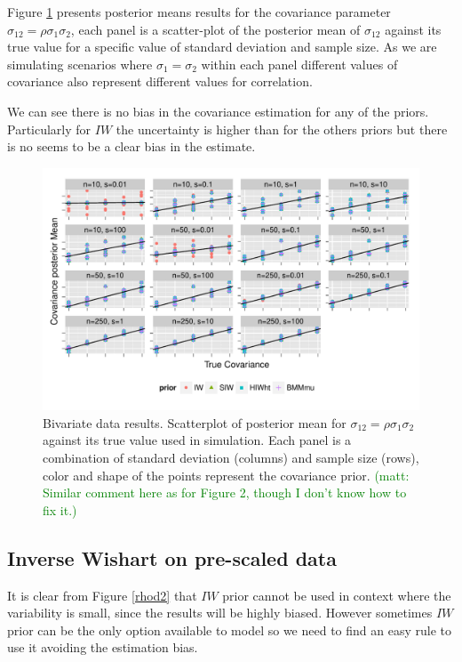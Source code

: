 \documentclass[a4paper]{article}
\newcommand{\matt}[1]{\textcolor{green}{(matt: #1)}}
\begin{document}
Figure \ref{devCov} presents posterior means results for the covariance parameter $\sigma_{12}=\rho\sigma_1\sigma_2$, each panel is a scatter-plot of the posterior mean of $\sigma_{12}$ against its true value for a specific value of standard deviation and sample size. As we are simulating scenarios where $\sigma_1 = \sigma_2$ within each panel different values of covariance also represent different values for correlation. 

We can see there is no bias in the covariance estimation for any of the priors. Particularly for $IW$ the uncertainty is higher than for the others priors but there is no seems to be a clear bias in the estimate. 
\begin{figure}[htbp]
   \centering
   \includegraphics[width=\textwidth]{fig_cov_d2} 
    \vspace{-.5in}
   \caption{Bivariate data results. Scatterplot of posterior mean for $\sigma_{12}=\rho\sigma_1\sigma_2$  against its true value used in simulation. Each panel is a combination of standard deviation (columns) and sample size (rows),  color and shape of the points represent the covariance prior. \label{devCov} \matt{Similar comment here as for Figure 2, though I don't know how to fix it.}}
\end{figure}

\subsection{Inverse Wishart on pre-scaled data}

It is clear from Figure \ref{rhod2} that $IW$ prior cannot be used in context where the variability is small, since the results will be highly biased. However sometimes $IW$ prior can be the only option available to model so we need to find an easy rule to use it avoiding the estimation bias. 
\end{document}
